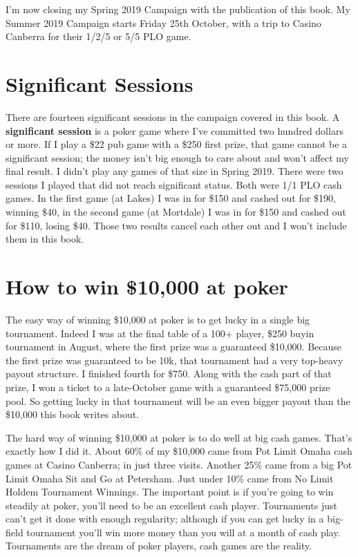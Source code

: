 I'm now closing my Spring 2019 Campaign with the publication of this
book. My Summer 2019 Campaign starts Friday 25th October, with a trip
to Casino Canberra for their 1/2/5 or 5/5 PLO game.

\section*{Significant Sessions}

There are fourteen significant sessions in the campaign covered in this
book. A \textbf{significant session} is a poker game where I've
committed two hundred dollars or more. If I play a \$22 pub game with
a \$250 first prize, that game cannot be a significant session; the
money isn't big enough to care about and won't affect my final
result. I didn't play any games of that size in Spring 2019. There
were two sessions I played that did not reach significant status. Both
were 1/1 PLO cash games. In the first game (at Lakes) I was in for
\$150 and cashed out for \$190, winning \$40, in the second game
(at Mortdale) I was in for \$150 and cashed out for \$110, losing
\$40. Those two results cancel each other out and I won't include them
in this book.

\section*{How to win \$10,000 at poker}

The easy way of winning \$10,000 at poker is to get lucky in a
single big tournament. Indeed I was at the final table of a 100+
player, \$250 buyin tournament in August, where the first prize was a
guaranteed \$10,000. Because the first prize was guaranteed to be 10k,
that tournament had a very top-heavy payout structure. I finished
fourth for \$750. Along with the cash part of that prize, I won a
ticket to a late-October game with a guaranteed \$75,000 prize
pool. So getting lucky in that tournament will be an even bigger
payout than the \$10,000 this book writes about.

The hard way of winning \$10,000 at poker is to do well at big cash
games. That's exactly how I did it. About 60\% of my \$10,000 came
from Pot Limit Omaha cash games at Casino Canberra; in just three
visits. Another 25\% came from a big Pot Limit Omaha Sit and Go at
Petersham. Just under 10\% came from No Limit Holdem Tournament
Winnings. The important point is if you're going to win steadily at
poker, you'll need to be an excellent cash player. Tournaments just
can't get it done with enough regularity; although if you can get
lucky in a big-field tournament you'll win more money than you will at
a month of cash play. Tournaments are the dream of poker players, cash
games are the reality.

